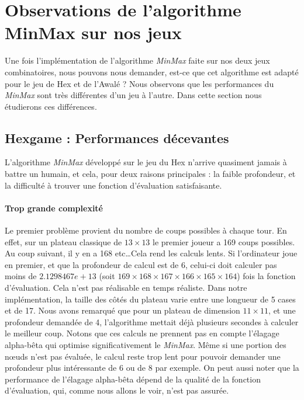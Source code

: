 




\section{Observations de l'algorithme MinMax sur nos jeux}
Une fois l'implémentation de l'algorithme \emph{MinMax} faite sur nos deux
jeux combinatoires, nous pouvons nous demander, est-ce que cet algorithme est adapté pour le jeu de Hex et de l'Awalé ?
Nous observons que les performances du \emph{MinMax} sont très différentes d'un jeu à l'autre. Dans cette section nous étudierons ces différences.

\subsection{Hexgame : Performances décevantes}
L'algorithme \emph{MinMax} développé sur le jeu du Hex n'arrive quasiment jamais à battre un humain, et cela, pour
deux raisons principales : la faible profondeur, et la difficulté à trouver une fonction d'évaluation satisfaisante.

\paragraph{Trop grande complexité} Le premier problème provient du nombre de coups possibles à chaque tour.
En effet, sur un plateau classique de $13\times13$ le premier joueur a 169 coups possibles. Au coup suivant, il y en a 168 etc\dots Cela rend les calculs lents. 
Si l'ordinateur joue en premier, et que la profondeur de calcul est de 6, celui-ci doit calculer pas moins de $2.1298467e+13$ (soit $169\times168\times167\times166\times165\times164$)
fois la fonction d'évaluation. Cela n'est pas réalisable en temps réaliste. Dans notre implémentation, la taille des côtés du plateau varie entre
une longueur de 5 cases et de 17. Nous avons remarqué que pour un plateau de dimension $11\times11$, et une profondeur demandée de 4, l'algorithme
mettait déjà plusieurs secondes à calculer le meilleur coup. Notons que ces calculs ne prennent pas en compte l'élagage alpha-bêta
qui optimise significativement le \emph{MinMax}. Même si une portion des nœuds n'est pas évaluée, le calcul reste trop lent pour pouvoir demander une
profondeur plus intéressante de 6 ou de 8 par exemple.
On peut aussi noter que la performance de l'élagage alpha-bêta dépend de la qualité de la fonction d'évaluation, qui, comme nous allons
le voir, n'est pas assurée.

